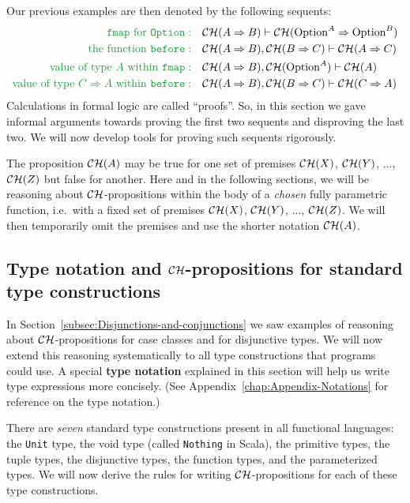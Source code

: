 Our previous examples are then denoted by the following sequents:
\begin{align*}
{\color{greenunder}\text{\texttt{fmap} for \texttt{Option}}:}\quad & {\cal CH}(A\Rightarrow B)\vdash{\cal CH}(\text{Option}^{A}\Rightarrow\text{Option}^{B})\\
{\color{greenunder}\text{the function \texttt{before}}:}\quad & {\cal CH}(A\Rightarrow B),{\cal CH}(B\Rightarrow C)\vdash{\cal CH}(A\Rightarrow C)\\
{\color{greenunder}\text{value of type }A\text{ within \texttt{fmap}}:}\quad & {\cal CH}(A\Rightarrow B),{\cal CH}(\text{Option}^{A})\vdash{\cal CH}(A)\\
{\color{greenunder}\text{value of type }C\Rightarrow A\text{ within \texttt{before}}:}\quad & {\cal CH}(A\Rightarrow B),{\cal CH}(B\Rightarrow C)\vdash{\cal CH}(C\Rightarrow A)
\end{align*}
Calculations in formal logic are called ``proofs''. So, in this
section we gave informal arguments towards proving the first two sequents
and disproving the last two. We will now develop tools for proving
such sequents rigorously.

The proposition ${\cal CH}(A)$ may be true for one set of premises
${\cal CH}(X)$, ${\cal CH}(Y)$, ..., ${\cal CH}(Z)$ but false for
another. Here and in the following sections, we will be reasoning
about ${\cal CH}$-propositions within the body of a \emph{chosen}
fully parametric function, i.e.~with a fixed set of premises ${\cal CH}(X)$,
${\cal CH}(Y)$, ..., ${\cal CH}(Z)$. We will then temporarily omit
the premises and use the shorter notation ${\cal CH}(A)$.

\subsection{Type notation and ${\cal CH}$-propositions for standard type constructions}

In Section~\ref{subsec:Disjunctions-and-conjunctions} we saw examples
of reasoning about ${\cal CH}$-propositions for case classes and
for disjunctive types. We will now extend this reasoning systematically
to all type constructions that programs could use. A special \textbf{type
notation} explained in this section will help
us write type expressions more concisely. (See Appendix~\ref{chap:Appendix-Notations}
for reference on the type notation.)

There are \emph{seven} standard type constructions present in all
functional languages: the \lstinline!Unit!
type, the void type (called \lstinline!Nothing!
in Scala), the primitive types, the tuple types, the disjunctive types,
the function types, and the parameterized types. We will now derive
the rules for writing ${\cal CH}$-propositions for each of these
type constructions.

